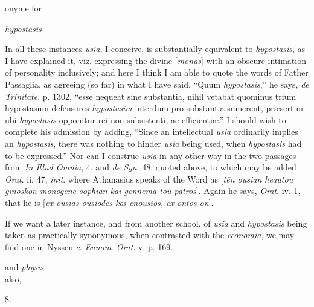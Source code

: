 onyme for

\emph{hypostasis}

In all these instances \emph{usia}, I
conceive, is substantially equivalent to \emph{hypostasis}, as
I have explained it, viz. expressing the divine [\emph{monas}]
with an obscure intimation of personality inclusively; and
here I think I am able to quote the words of Father Passaglia,
as agreeing (so far) in what I have said. ``Quum \emph{hypostasis},''
he says, \emph{de Trinitate}, p. 1302, ``esse nequeat sine
substantia, nihil vetabat quominus trium hypostasum defensores
\emph{hypostasim} interdum pro substantia sumerent, præsertim
ubi \emph{hypostasis} opponitur rei non subsistenti, ac
efficientiæ.'' I should wish to complete his admission by
adding, ``Since an intellectual \emph{usia} ordinarily implies
an \emph{hypostasis}, there was nothing to hinder \emph{usia}
being used, when \emph{hypostasis} had to be expressed.''
Nor can I construe \emph{usia} in any other way in the two
passages from \emph{In Illud Omnia}, 4, and \emph{de Syn}. 48,
quoted above, to which may be added \emph{Orat}. ii. 47, \emph{init}.
where Athanasius speaks of the Word as [\emph{t\={e}n ousian
heautou gin\={o}sk\={o}n monogen\={e} sophian kai
genn\={e}ma tou patros}]. Again he says, \emph{Orat}.
iv. 1, that he is [\emph{ex ousias ousi\={o}d\={e}s kai
enousios, ex ontos \={o}n}].

If we want a later instance, and from
another school, of \emph{usia} and \emph{hypostasis} being
taken as practically synonymous, when contrasted with the \emph{economia},
we may find one in Nyssen \emph{c}. \emph{Eunom}. \emph{Orat}.
v. p. 169.

and \emph{physis}\\
also,

8.


